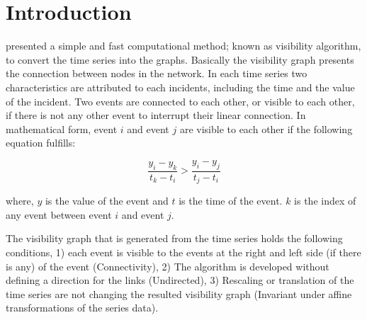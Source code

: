 
\section{Introduction}
\noindent
\citet{Lacasa2008} presented a simple and fast computational method; known as visibility algorithm, to convert the time series into the graphs. Basically the visibility graph presents the connection between nodes in the network. In each time series two characteristics are attributed to each incidents, including the time and the value of the incident. Two events are connected to each other, or visible to each other, if there is not any other event to interrupt their linear connection. In mathematical form, event $i$ and event $j$ are visible to each other if the following equation fulfills:

\begin{equation}
\frac{y_i - y_k }{t_k - t_i} > \frac{y_i - y_j}{ t_j - t_i} 
\end{equation}

\noindent
where, $y$ is the value of the event and $t$ is the time of the event. $k$ is the index of any event between event $i$ and event $j$. 

\noindent
The visibility graph that is generated from the time series holds the following conditions, 1) each event is visible to the events at the right and left side (if there is any) of the event  (Connectivity), 2) The algorithm is developed without defining a direction for the links (Undirected),  3) Rescaling or translation of the time series are not changing the resulted visibility graph (Invariant under affine transformations of  the series data)\citep{Lacasa2008}.

